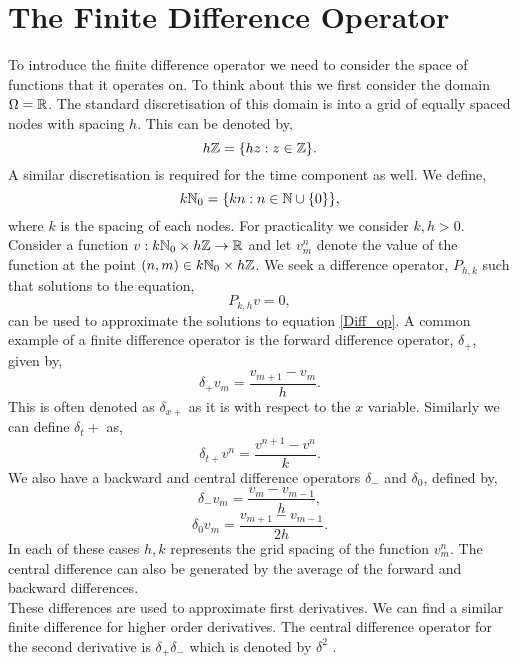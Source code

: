 \section{The Finite Difference Operator}
\label{fin_diff}
To introduce the finite difference operator we need to consider the space of functions that it operates on. To think about this we first consider the domain $\Omega=\mathbb{R}$. The standard discretisation of this domain is into a grid of equally spaced nodes with spacing $h$. This can be denoted by,
\begin{equation*}
h\mathbb{Z}=\{hz:z\in \mathbb{Z}\}.
\end{equation*}
A similar discretisation is required for the time component as well. We define,
\begin{equation*}
k\mathbb{N}_0=\{kn:n\in \mathbb{N}\cup\{0\}\},
\end{equation*}
where $k$ is the spacing of each nodes.
For practicality we consider $k,h>0$.\\
Consider a function $v: k\mathbb{N}_0 \times h\mathbb{Z} \rightarrow \mathbb{R}$ and let $v^n_m$ denote the value of the function at the point $\left( n,m \right)\in k\mathbb{N}_0 \times h\mathbb{Z}$.
We seek a difference operator, $P_{h,k}$ such that solutions to the equation,
\begin{equation}
P_{k,h}v=0, \label{fin_op}
\end{equation} 
can be used to approximate the solutions to equation \ref{Diff_op}. A common example of a finite difference operator is the forward difference operator, $\delta_+$, given by, $$\delta_+ v_m=\frac{v_{m+1}-v_m}{h}.$$
This is often denoted as $\delta_{x+}$ as it is with respect to the $x$ variable. Similarly we can define $\delta_t+$ as, 
$$\delta_{t+}v^n=\frac{v^{n+1}-v^n}{k}.$$
We also have a backward and central difference operators $\delta_-$ and $\delta_0$, defined by,
$$\delta_-v_m=\frac{v_m-v_{m-1}}{h},$$
$$\delta_0 v_m=\frac{v_{m+1}-v_{m-1}}{2h}.$$
In each of these cases $h,k$ represents the grid spacing of the function $v_m^n$. The central difference can also be generated by the average of the forward and backward differences.\\
These differences are used to approximate first derivatives. We can find a similar finite difference for higher order derivatives. The central difference operator for the second derivative is $\delta_+\delta_-$ which is denoted by $\delta^2$ .

